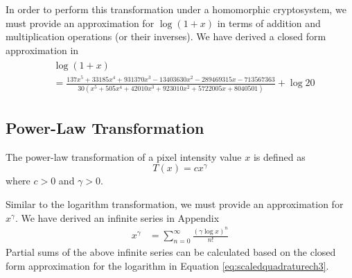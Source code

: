 In order to perform this transformation under a homomorphic cryptosystem, we must provide an approximation for $\log\left(1 + x\right)$ in terms of addition and multiplication operations (or their inverses). We have derived a closed form approximation in %
\begin{align}
	\label{eq:scaledquadraturech3}
  \begin{split}
    &\log(1+x) \\
    &=\frac{137x^5 + 33185x^4 + 931370x^3 - 13403630x^2 - 289469315x - 713567363}
    {30(x^5 + 505x^4 + 42010x^3 + 923010x^2 + 5722005x + 8040501)} + \log{20}
  \end{split}
\end{align}

\subsection{Power-Law Transformation}
The power-law transformation of a pixel intensity value $x$ is defined as
\begin{equation}
    T\left(x\right) = cx^{\gamma}
\end{equation}
where $c>0$ and $\gamma > 0$.

Similar to the logarithm transformation, we must provide an approximation for $x^\gamma$.
We have derived an infinite series in Appendix %
\begin{align*}
	x^\gamma &= \sum_{n=0}^{\infty}{\frac{(\gamma\log{x})^n}{n!}}
\end{align*}
Partial sums of the above infinite series can be calculated based on the closed form approximation for the logarithm in Equation \ref{eq:scaledquadraturech3}.
